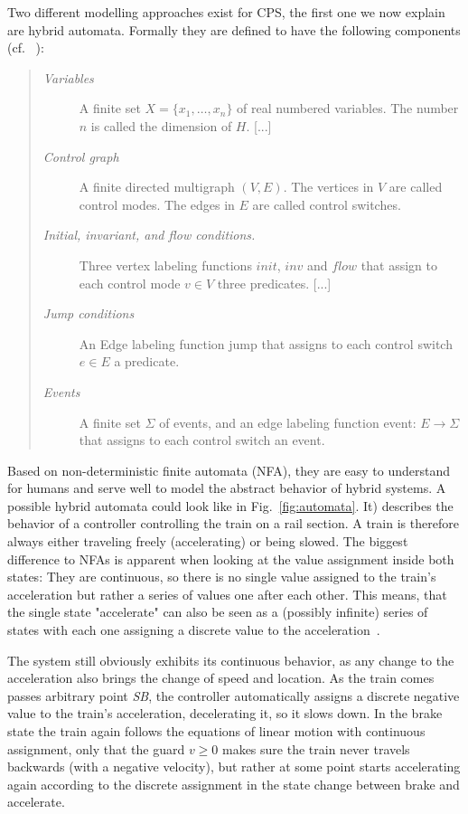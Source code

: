 Two different modelling approaches exist for CPS, the first one we now explain are hybrid automata. Formally they are defined to have the following components (cf. ~\cite{Heinzinger2000b}):
\begin{quote}
		\begin{description}
			\item[\textit{Variables}]A finite set \(X = \{x_1,\dots , x_n\}\) of real numbered variables. The number \(n\) is called the dimension of \(H\). [...]
			\item[\textit{Control graph}]A finite directed multigraph \((V, E)\). The vertices in \(V\) are called control modes. The edges in \(E\) are called control switches.
			\item[\textit{Initial, invariant, and flow conditions.}]Three vertex labeling functions \(init\), \(inv\) and \(flow\) that assign to each control mode \(v\in V\) three predicates. [...]
			\item[\textit{Jump conditions}]An Edge labeling function jump that assigns to each control switch  \(e \in E\) a predicate.
			\item[\textit{Events}]A finite set \(\Sigma\) of events, and an edge labeling function event: \(E \rightarrow \Sigma\) that assigns to each control switch an event.
		\end{description}
\end{quote} 

Based on non-deterministic finite automata (NFA), they are easy to understand for humans and serve well to model the abstract behavior of hybrid systems. A possible hybrid automata could look like in Fig.~\ref{fig:automata}. It) describes the behavior of a controller controlling the train on a rail section. A train is therefore always either traveling freely (accelerating)  or being slowed. The biggest difference to NFAs is apparent when looking at the value assignment inside both states: They are continuous, so there is no single value assigned to the train's acceleration but rather a series of values one after each other. This means, that the single state "accelerate" can also be seen as a (possibly infinite) series of states with each one assigning a discrete value to the acceleration~\cite{platzerb2010}.

The system still obviously exhibits its continuous behavior, as any change to the acceleration also brings the change of speed and location. As the train comes passes arbitrary  point \emph{SB}, the controller automatically assigns a discrete negative value to the train's acceleration, decelerating it, so it slows down. In the brake state the train again follows the equations of linear motion with continuous assignment, only that the guard \(v \geq 0\) makes sure the train never travels backwards (with a negative velocity), but rather at some point starts accelerating again according to the discrete assignment in the state change between brake and accelerate.

